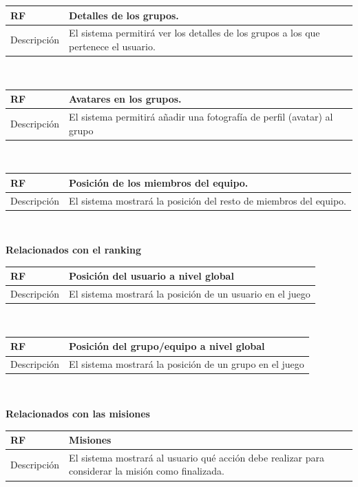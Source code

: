 \documentclass[twoside]{report}
\newcommand\addrow[2]{#1 &#2\\ }
\newcommand\addheading[2]{#1 &#2\\ \hline}
\newcommand\tabularhead{\begin{tabular}{lp{0.7\textwidth}}
\hline
}
\newenvironment{req}{\tabularhead}
{\hline\end{tabular}}
\begin{document}
\begin{req}
	\addheading{\textbf{RF\arabic{functionalRequirements}}}{Detalles de los grupos.}
	\addrow{Descripción}{El sistema permitirá ver los detalles de los grupos a los que pertenece el usuario.}
\end{req}\\

\begin{req}
	\addheading{\textbf{RF\arabic{functionalRequirements}}}{Avatares en los grupos.}
	\addrow{Descripción}{El sistema permitirá añadir una fotografía de perfil (avatar) al grupo}
\end{req}\\

\begin{req}
	\addheading{\textbf{RF\arabic{functionalRequirements}}}{Posición de los miembros del equipo.}
	\addrow{Descripción}{El sistema mostrará la posición del resto de miembros del equipo. }
\end{req}\\

\textbf{Relacionados con el ranking}\\

\begin{req}
	\addheading{\textbf{RF\arabic{functionalRequirements}}}{Posición del usuario a nivel global}
	\addrow{Descripción}{El sistema mostrará la posición de un usuario en el juego}
\end{req}\\

\begin{req}
	\addheading{\textbf{RF\arabic{functionalRequirements}}}{Posición del grupo/equipo a nivel global}
	\addrow{Descripción}{El sistema mostrará la posición de un grupo en el juego}
\end{req}\\

\textbf{Relacionados con las misiones}\\

\begin{req}
	\addheading{\textbf{RF\arabic{functionalRequirements}}}{Misiones}
	\addrow{Descripción}{El sistema mostrará al usuario qué acción debe realizar para considerar la misión como finalizada.}
\end{req}\\
\end{document}
